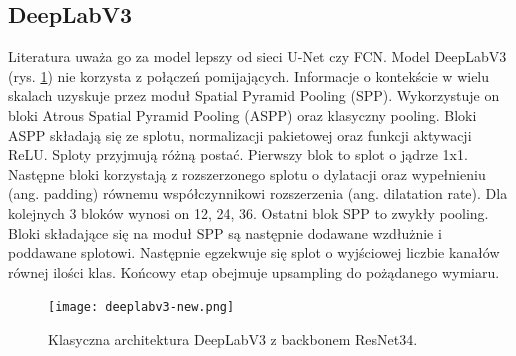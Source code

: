 \subsection{DeepLabV3}
Literatura uważa go za model lepszy od sieci U-Net czy FCN. Model DeepLabV3 (rys. \ref{fig:deeplabv3}) nie korzysta z połączeń pomijających. Informacje o kontekście w wielu skalach uzyskuje przez moduł Spatial Pyramid Pooling (SPP). Wykorzystuje on bloki Atrous Spatial Pyramid Pooling (ASPP) oraz klasyczny pooling. Bloki ASPP składają się ze splotu, normalizacji pakietowej oraz funkcji aktywacji ReLU. Sploty przyjmują różną postać. Pierwszy blok to splot o jądrze 1x1. Następne bloki korzystają z rozszerzonego splotu o dylatacji oraz wypełnieniu (ang. padding) równemu współczynnikowi rozszerzenia (ang. dilatation rate). Dla kolejnych 3 bloków wynosi on 12, 24, 36. Ostatni blok SPP to zwykły pooling. Bloki składające się na moduł SPP są następnie dodawane wzdłużnie i poddawane splotowi. Następnie egzekwuje się splot o wyjściowej liczbie kanałów równej ilości klas. Końcowy etap obejmuje upsampling do pożądanego wymiaru.
\begin{figure}[ht!]
\texttt{[image: deeplabv3-new.png]}
\caption{Klasyczna architektura DeepLabV3 z backbonem ResNet34.}
\label{fig:deeplabv3}
\end{figure}



